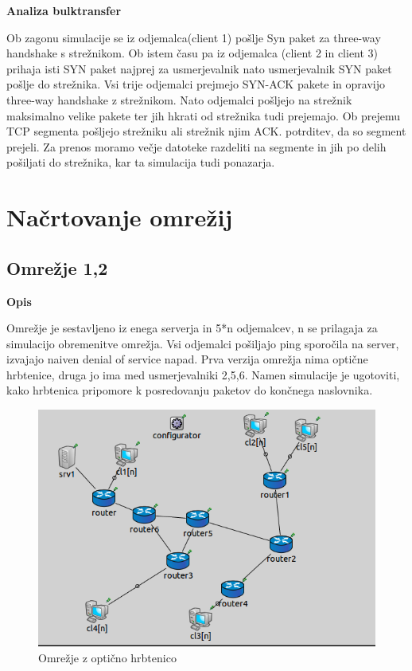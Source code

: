 \documentclass[a4paper,11pt]{article}
\begin{document}
\setlength{\parindent}{0pt}
\large\bf Analiza bulktransfer\par
\setlength{\parindent}{10pt}
\normalfont \normalsize
Ob zagonu simulacije se iz odjemalca(client 1) pošlje Syn paket za three-way handshake s strežnikom. Ob istem času pa iz odjemalca (client 2 in client 3) prihaja isti SYN paket najprej za usmerjevalnik nato usmerjevalnik SYN paket pošlje do strežnika. Vsi trije odjemalci prejmejo SYN-ACK pakete in opravijo three-way handshake z strežnikom. Nato odjemalci pošljejo na strežnik maksimalno velike pakete ter jih hkrati od strežnika tudi prejemajo. Ob prejemu TCP segmenta pošljejo strežniku ali strežnik njim ACK. potrditev, da so segment prejeli. Za prenos moramo večje datoteke razdeliti na segmente in jih po delih pošiljati do strežnika, kar ta simulacija tudi ponazarja.

\pagebreak

\section{Načrtovanje omrežij}\par
\subsection{Omrežje 1,2}
\large \bf Opis \par
\normalfont \normalsize
Omrežje je sestavljeno iz enega serverja in 5*n odjemalcev, n se prilagaja za simulacijo obremenitve omrežja. Vsi odjemalci pošiljajo ping sporočila na server, izvajajo naiven denial of service napad. Prva verzija omrežja nima optične hrbtenice, druga jo ima med usmerjevalniki 2,5,6. 
Namen simulacije je ugotoviti, kako hrbtenica pripomore k posredovanju paketov do končnega naslovnika.

\begin{figure}[h]
	\centering
	\includegraphics[width=\textwidth]{omrHrbet.png}
	\caption{Omrežje z optično hrbtenico}
	\label{opticnaHrbtenica}	
\end{figure}
\end{document}
